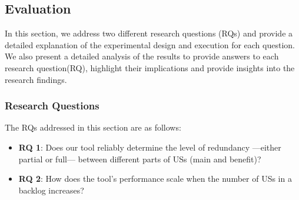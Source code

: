 \subsection{Evaluation}\label{redundancy_evaluation}
In this section, we address two different research questions (RQs) and provide a detailed explanation of the experimental design and execution for each question. We also present a detailed analysis of the results to provide answers to each research question(RQ), highlight their implications and provide insights into the research findings.
\subsubsection*{Research Questions}
The RQs addressed in this section are as follows:
\begin{itemize}
	\item \textbf{RQ 1}: Does our tool reliably determine the level of redundancy —either partial or full— between different parts of USs (main and benefit)?
	\item \textbf{RQ 2}: How does the tool's performance scale when the number of USs in a backlog increases?
	\end{itemize}
